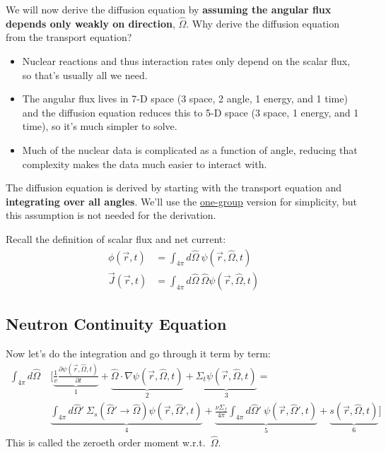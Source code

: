 \documentclass[12pt]{article}
\newlength{\up}
\newcommand{\vOmega}{\ensuremath{\hat{\Omega}}}
\begin{document}
We will now derive the diffusion equation by \textbf{assuming the angular flux depends only weakly on direction}, $\vOmega$. 
%
Why derive the diffusion equation from the transport equation?
\begin{itemize}
\item Nuclear reactions and thus interaction rates only depend on the scalar flux, so that's usually all we need.
\item The angular flux lives in 7-D space (3 space, 2 angle, 1 energy, and 1 time) and the diffusion equation reduces this to 5-D space (3 space, 1 energy, and 1 time), so it's much simpler to solve.
\item Much of the nuclear data is complicated as a function of angle, reducing that complexity makes the data much easier to interact with.
\end{itemize}

The diffusion equation is derived by starting with the transport equation and \textbf{integrating over all angles}. We'll use the \underline{one-group} version for simplicity, but this assumption is not needed for the derivation. 

Recall the definition of scalar flux and net current:
\begin{align*}
\phi(\vec{r}, t) &= \int_{4\pi} d\vOmega \:\psi(\vec{r}, \vOmega, t) \\
\vec{J}(\vec{r}, t) &= \int_{4\pi} d\vOmega \:\vOmega \psi(\vec{r}, \vOmega, t)
\end{align*}

\subsection*{Neutron Continuity Equation}
Now let's do the integration and go through it term by term:
%
\begin{align*}
\int_{4\pi} d\vOmega\: &\biggl[\underbrace{\frac{1}{v}\frac{\partial \psi(\vec{r}, \vOmega, t)}{\partial t}}_{1} + 
\underbrace{\vOmega \cdot \nabla \psi(\vec{r}, \vOmega, t)}_{2} +
\underbrace{\Sigma_t \psi(\vec{r}, \vOmega, t)}_{3} = \nonumber\\
%
&\underbrace{\int_{4\pi} d\vOmega'\: \Sigma_s(\vOmega' \rightarrow \vOmega) \psi(\vec{r}, \vOmega', t)}_{4} 
+ \underbrace{\frac{\nu \Sigma_f}{4\pi} \int_{4\pi} d\vOmega'\: \psi(\vec{r},  \vOmega', t)}_{5}
+ \underbrace{s(\vec{r}, \vOmega, t)}_{6}\biggr]
\end{align*}
%
This is called the zeroeth order moment w.r.t.\ $\vOmega$. 
\end{document}
